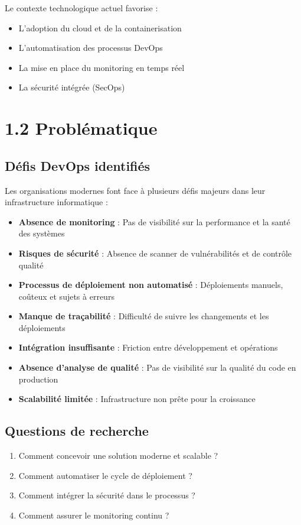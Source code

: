 \documentclass[12pt,a4paper]{report}
\begin{document}
Le contexte technologique actuel favorise :

\begin{itemize}
    \item L'adoption du cloud et de la containerisation
    \item L'automatisation des processus DevOps
    \item La mise en place du monitoring en temps réel
    \item La sécurité intégrée (SecOps)
\end{itemize}

\section{1.2 Problématique}

\subsection{Défis DevOps identifiés}

Les organisations modernes font face à plusieurs défis majeurs dans leur infrastructure informatique :

\begin{itemize}
    \item \textbf{Absence de monitoring} : Pas de visibilité sur la performance et la santé des systèmes
    \item \textbf{Risques de sécurité} : Absence de scanner de vulnérabilités et de contrôle qualité
    \item \textbf{Processus de déploiement non automatisé} : Déploiements manuels, coûteux et sujets à erreurs
    \item \textbf{Manque de traçabilité} : Difficulté de suivre les changements et les déploiements
    \item \textbf{Intégration insuffisante} : Friction entre développement et opérations
    \item \textbf{Absence d'analyse de qualité} : Pas de visibilité sur la qualité du code en production
    \item \textbf{Scalabilité limitée} : Infrastructure non prête pour la croissance
\end{itemize}

\subsection{Questions de recherche}

\begin{enumerate}
    \item Comment concevoir une solution moderne et scalable ?
    \item Comment automatiser le cycle de déploiement ?
    \item Comment intégrer la sécurité dans le processus ?
    \item Comment assurer le monitoring continu ?
\end{enumerate}
\end{document}
